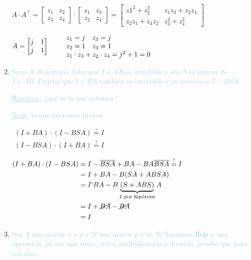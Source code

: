 \begin{enumerate}[label=\color{red}\textbf{\arabic*)}, leftmargin=*]
	$A\cdot A^\intercal =\begin{bmatrix}
		z_1 & z_2\\
		z_3 & z_4
	\end{bmatrix}\cdot\begin{bmatrix}
		z_1 & z_3\\
		z_2 & z_4
	\end{bmatrix}=\begin{bmatrix}
		z1^2+z_2^2 & z_1z_3+z_2z_4\\
		z_2z_1+z_4z_2 & z_3^2+z_4^2
	\end{bmatrix}$
	
	$A=\begin{bmatrix}
		j & 1\\
		j  & 1
	\end{bmatrix}\qquad\begin{array}{ll}
		z_1=j & z_3=j\\
		z_2=1 & z_4=1\\
		\multicolumn{2}{l}{z_1\cdot z_3+z_2\cdot z_4=j^2+1=0 } 
	\end{array}$
	\item \textcolor{lightblue}{Sean $A,B$ matrices tales que $I+AB$ es invertible
		y sea $S$ la inversa de $I+AB$. Prueba que $I+BA$ también es invertible y su
		inversa es $I-BSA$.}
	
	\textcolor{lightblue}{\underline{Hipótesis:} ¿qué es lo que sabemos?}
	
	
	\textcolor{lightblue}{\underline{Tesis:} lo que queremos probar}
	
	$\begin{array}{l}
		(I+BA)\cdot(I-BSA)\overset{?}{=}I\\
		(I-BSA)\cdot(I+BA)\overset{?}{=}I
	\end{array}$
	
	$\begin{aligned}
		(I+BA)\cdot(I-BSA)&=I-\overline{BSA}+BA-BA\overline{BSA}\overset{?}{=}I\\
		&=I+BA-B(SA+ABSA)\\
		&=I`BA-B\underbrace{(S+ABS)}_{I\text{ por hipótesis}}A\\
		&=I+\cancel{BA}-\cancel{BA}\\
		&=I
	\end{aligned}$
	\item \textcolor{lightblue}{Sea $A$ una matriz $n\times p$ y $B$ una matriz
		$p\times m$. Si llamamos \textbf{flop} a una operación, ya sea una suma, resta,
		multiplicación o división, prueba que para calcular }
	

\end{enumerate}
